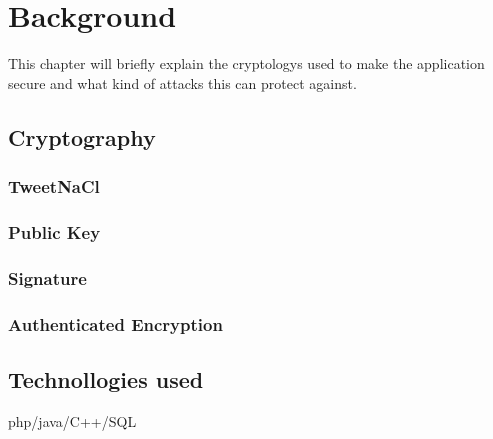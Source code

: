 
\chapter{Background}
\label{back}


This chapter will briefly explain the cryptologys used to make the application secure and what kind of attacks this can protect against. 

\section{Cryptography}

\subsection{TweetNaCl}

\subsection{Public Key}

\subsection{Signature}

\subsection{Authenticated Encryption}

\section{Technollogies used}

php/java/C++/SQL